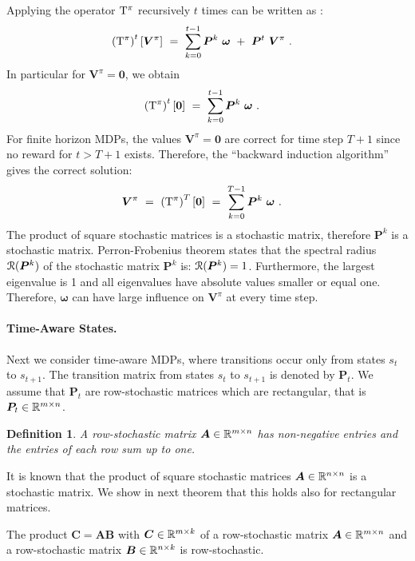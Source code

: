 \documentclass{article}
\newtheorem{definitionA}{Definition}
\newcommand\BA{\bm{A}}
\newcommand\BB{\bm{B}}
\newcommand\BC{\bm{C}}
\newcommand\BP{\bm{P}}
\newcommand\BV{\bm{V}}
\newcommand\Bom{\bm{\omega}}
\newcommand\BZe{\bm{0}}
\begin{document}
\begin{appendices}
Applying the operator $\mathrm{T}^\pi$ recursively
$t$ times can be written as \cite{Bertsekas:91}:
\begin{align}
  \left(\rT^\pi \right)^t \left[ \BV^{\pi} \right]    \ &= \
  \sum_{k=0}^{t-1}  \BP^k \ \Bom
  \ + \  \BP^t \ \BV^{\pi}  \ .
\end{align}
In particular for $\BV^{\pi}=\BZe$, we obtain
\begin{align}
  \left(\rT^\pi \right)^t \left[ \BZe \right]    \ &= \
  \sum_{k=0}^{t-1}  \BP^k \ \Bom \ .
\end{align}
For finite horizon MDPs,
the values $\BV^{\pi}=\BZe$ are correct for time step $T+1$ since
no reward for $t>T+1$ exists. Therefore, the 
``backward induction algorithm'' \cite{Puterman:90,Puterman:05} gives
the correct solution:
\begin{align}
  \BV^{\pi} \ &= \   \left(\rT^\pi \right)^T \left[ \BZe \right]    \ = \
  \sum_{k=0}^{T-1}  \BP^k \ \Bom \ .
\end{align}
The product of square stochastic matrices is a stochastic matrix,
therefore $\BP^k$ is a stochastic matrix.
Perron-Frobenius theorem states that the spectral radius
$\cR(\BP^k)$ of the stochastic matrix $\BP^k$ is: $\cR(\BP^k)=1$.
Furthermore, the largest eigenvalue is 1 and all
eigenvalues have absolute values smaller or equal one.
Therefore, $\Bom$ can have large influence on $\BV^{\pi}$ at every time step. 




\paragraph{Time-Aware States.}

Next we consider time-aware MDPs, where transitions occur only from
states $s_t$ to $s_{t+1}$. The transition matrix from
states $s_t$ to $s_{t+1}$ is denoted by $\BP_t$. We assume that
$\BP_t$ are row-stochastic matrices which are rectangular, that is
$\BP_t\in \dR^{m\times n}$.
\begin{definitionA}
A row-stochastic matrix $\BA \in \dR^{m\times n}$ has
non-negative entries and the entries of each row sum up to one.
\end{definitionA}
It is known that the product of
square stochastic matrices  $\BA \in \dR^{n\times n}$ is a
stochastic matrix. We show in next theorem
that this holds also for rectangular matrices.
\begin{lemmaA}
\label{th:ArowStochastic}
  The product $\BC=\BA \BB$ with $\BC \in \dR^{m\times k}$
  of a row-stochastic matrix $\BA \in \dR^{m\times n}$
and a row-stochastic matrix $\BB \in \dR^{n\times k}$ is row-stochastic.
\end{lemmaA}


\end{appendices}
\end{document}
